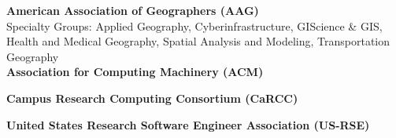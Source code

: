\documentclass{acmcv}
\begin{document}

    \vspace*{0.5cm}
\vspace*{.3cm}

    \textbf{American Association of Geographers (AAG)} \\
    Specialty Groups: Applied Geography, Cyberinfrastructure, GIScience \& GIS, Health and Medical Geography, Spatial Analysis and Modeling, Transportation Geography \\

    \textbf{Association for Computing Machinery (ACM)}

    \textbf{Campus Research Computing Consortium (CaRCC)}

    \textbf{United States Research Software Engineer Association (US-RSE)}
\end{document}
